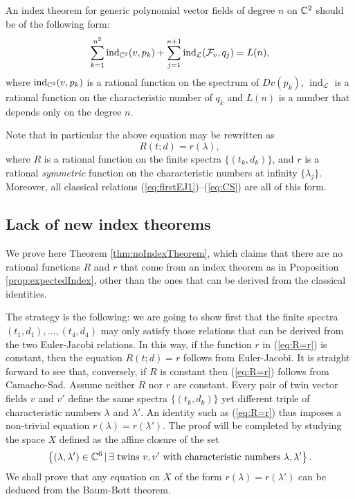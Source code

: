 \documentclass[phd,tocprelim]{cornell}
\begin{document}
\begin{proposition}\label{prop:expectedIndex}
 An index theorem for generic polynomial vector fields of degree $n$ on $\mathbb{C}^2$ should be of the following form:
  \[ \sum_{k=1}^{n^2} \operatorname{ind}_{\mathbb{C}^2}(v,p_k) + \sum_{j=1}^{n+1} \operatorname{ind}_{\mathcal{L}}(\mathcal{F}_v,q_j) = L(n), \]
 where $\operatorname{ind}_{\mathbb{C}^2}(v,p_k) $ is a rational function on the spectrum of $Dv(p_k)$, $\operatorname{ind}_{\mathcal{L}}$ is a rational function on the characteristic number of $q_k$ and $L(n)$ is a number that depends only on the degree $n$.
\end{proposition}

Note that in particular the above equation may be rewritten as 
 \begin{equation}\label{eq:R=r} 
  R(t;d) = r(\lambda), 
 \end{equation}
where $R$ is a rational function on the finite spectra $\{(t_k,d_k)\}$, and $r$ is a rational \textit{symmetric} function on the characteristic numbers at infinity $\{\lambda_j\}$. Moreover, all classical relations (\ref{eq:firstEJ1})--(\ref{eq:CS}) are all of this form.


\subsection{Lack of new index theorems}

We prove here Theorem \ref{thm:noIndexTheorem}, which claims that there are no rational functions $R$ and $r$ that come from an index theorem as in Proposition \ref{prop:expectedIndex}, other than the ones that can be derived from the classical identities.

The strategy is the following: we are going to show first that the finite spectra $(t_1,d_1),\ldots,(t_4,d_4)$ may only satisfy those relations that can be derived from the two Euler-Jacobi relations. In this way, if the function $r$ in (\ref{eq:R=r}) is constant, then the equation $R(t;d)=r$ follows from Euler-Jacobi. It is straight forward to see that, conversely, if $R$ is constant then (\ref{eq:R=r}) follows from Camacho-Sad. Assume neither $R$ nor $r$ are constant. Every pair of twin vector fields $v$ and $v'$ define the same spectra $\{(t_k,d_k)\}$ yet different triple of characteristic numbers $\lambda$ and $\lambda'$. An identity such as (\ref{eq:R=r}) thus imposes a non-trivial equation $r(\lambda)=r(\lambda')$. The proof will be completed by studying the space $X$ defined as the affine closure of the set
 \[ \left\{{(\lambda,\lambda')\in\mathbb{C}^6}\,\vert\,{\exists\mbox{ twins }v,v'\mbox{ with characteristic numbers }\lambda,\lambda'}\right\}. \]
We shall prove that any equation on $X$ of the form $r(\lambda)=r(\lambda')$ can be deduced from the Baum-Bott theorem.
 
\end{document}
